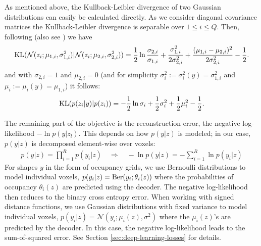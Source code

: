 As mentioned above, the Kullback-Leibler divergence of two Gaussian
distributions can easily be calculated directly.
As we consider diagonal covariance matrices the Kullback-Leibler divergence
is separable over $1 \leq i \leq Q$. Then, following \cite[Section~9]{Kullback:1959} 
(also see \cite[Appendix~A]{RasmussenWilliams:2006}) we have
\begin{align}
  \mathrm{KL}(\mathcal{N}(z_i ; \mu_{1,i}, \sigma_{1,i}^2)|\mathcal{N}(z_i ; \mu_{2,i},\sigma_{2,i}^2))
  = \frac{1}{2} \ln\frac{\sigma_{2,i}}{\sigma_{1,i}} + \frac{\sigma_{1,i}^2}{2\sigma_{2,i}^2} + \frac{(\mu_{1,i} - \mu_{2,i})^2}{2 \sigma_{2,i}^2} - \frac{1}{2}.
\end{align}
and with $\sigma_{2,i} = 1$ and $\mu_{2,i} = 0$
(and for simplicity $\sigma_i^2 := \sigma_i^2(y) = \sigma_{1,i}^2$ and $\mu_i := \mu_i(y) = \mu_{1,i} $) it follows:
\begin{align}
  \mathrm{KL}(p(z_i | y) | p(z_i)) = - \frac{1}{2} \ln \sigma_i + \frac{1}{2} \sigma_i^2 + \frac{1}{2} \mu_i^2 - \frac{1}{2}.
  \label{eq:shape-prior-analyitcal-kld}
\end{align}

The remaining part of the objective
is the reconstruction error, \ie the negative log-likelihood $- \ln p(y | z_l)$.
This depends on how $p(y|z)$ is modeled; in our case, $p(y|z)$
is decomposed element-wise over voxels:
\begin{align}
  p(y|z) = \prod_{i = 1}^R p(y_i | z)\quad\Rightarrow\quad -\ln p(y | z) = -\sum_{i = 1}^R \ln p(y_i | z)
\end{align}
For shapes $y$ in the form of occupancy grids, we use Bernoulli distributions
to model individual voxels, \ie $p(y_i | z) = \mathrm{Ber}(y_i ; \theta_i(z))$ where
the probabilities of occupancy $\theta_i(z)$ are predicted using the decoder.
The negative log-likelihood then 
reduces to the binary cross entropy error. When working with signed distance functions,
we use Gaussian distributions with fixed variance to model individual voxels,
\ie $p(y_i | z) = \mathcal{N}(y_i; \mu_i(z), \sigma^2)$ where the $\mu_i(z)$'s
are predicted by the decoder. In this case, the negative log-likelihood leads
to the sum-of-squared error. See Section \ref{sec:deep-learning-losses} for details.

